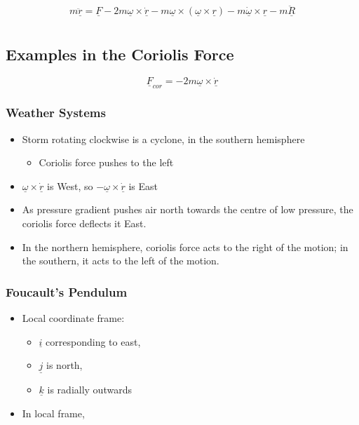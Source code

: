 \documentclass[a4paper,11pt,normalem]{article}
\begin{document}
\[
    m\underline{\ddot{r}} = \underline{F} - 2m\underline{\omega} \times \underline{\dot{r}} - m\underline{\omega} \times (\underline{\omega} \times \underline{r}) - m\underline{\dot{\omega}} \times \underline{r} - m\underline{\ddot{R}}
\]

\section{}\label{lecture-15}

\subsection{Examples in the Coriolis Force}\label{examples-in-the-coriolis-force}

\[
    \underline{F}_{cor} = -2m\underline{\omega} \times \underline{\dot{r}}
\]

\subsubsection{Weather Systems}\label{weather-systems}

\begin{itemize}
\item
  Storm rotating clockwise is a cyclone, in the southern hemisphere
  \begin{itemize}
  \item
    Coriolis force pushes to the left
  \end{itemize}
\item
  \(\underline{\omega} \times \underline{\dot{r}}\) is West, so
  \(-\underline{\omega} \times \underline{\dot{r}}\) is East
\item
  As pressure gradient pushes air north towards the centre of low
  pressure, the coriolis force deflects it East.
\item
  In the northern hemisphere, coriolis force acts to the right of the motion; in the southern, it acts to the left of the motion.
\end{itemize}

\subsubsection{Foucault's Pendulum}\label{foucaults-pendulum}

\begin{itemize}
\item
  Local coordinate frame:
  \begin{itemize}
  \item
    \(\underline{i}\) corresponding to east,
  \item
    \(\underline{j}\) is north,
  \item
    \(\underline{k}\) is radially outwards
  \end{itemize}
\item
  In local frame,
\end{itemize}
\end{document}
